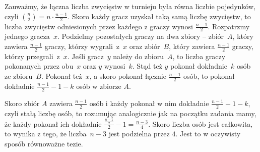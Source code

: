\noindent
Zauważmy, że łączna liczba zwycięstw w turnieju była równa liczbie pojedynków, czyli ${{n}\choose{2}} = n \cdot \frac{n - 1}{2}$. Skoro każdy gracz uzyskał taką samą liczbę zwycięstw, to liczba zwycięstw odniesionych przez każdego z graczy wynosi $\frac{n - 1}{2}$.
Rozpatrzmy jednego gracza~$x$. Podzielmy pozostałych graczy na dwa zbiory -- zbiór~$A$, który zawiera $\frac{n - 1}{2}$ graczy, którzy wygrali~z~$x$ oraz zbiór~$B$, który zawiera $\frac{n - 1}{2}$ graczy, którzy przegrali~z~$x$. 
Jeśli gracz~$y$ należy do zbioru~$A$, to liczba graczy pokonanych przez obu~$x$ oraz $y$ wynosi~$k$. Stąd też $y$ pokonał dokładnie~$k$ osób ze zbioru~$B$. Pokonał też~$x$, a skoro pokonał łącznie $\frac{n - 1}{2}$ osób, to pokonał dokładnie $\frac{n - 1}{2} - 1 - k$ osób w zbiorze $A$.

\begin{center}
\end{center}

\vspace{10px}
\noindent
Skoro zbiór $A$ zawiera $\frac{n - 1}{2}$ osób i każdy pokonał w nim dokładnie $\frac{n - 1}{2} - 1 - k$, czyli stałą liczbę osób, to rozumując analogicznie jak na początku zadania mamy, że każdy pokonał ich dokładnie $\frac{\frac{n - 1}{2}}{2} - 1 = \frac{n - 3}{4}$. Skoro liczba osób jest całkowita, to wynika z tego, że liczba~$n - 3$ jest podzielna przez $4$. Jest to w oczywisty sposób równoważne tezie.

